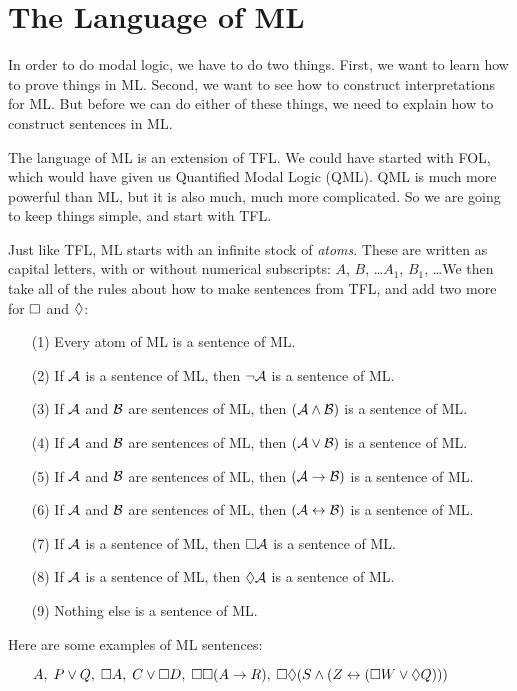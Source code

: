 \section{The Language of ML}
\label{TFLtoML}

In order to do modal logic, we have to do two things. First, we want to learn how to prove things in ML. Second, we want to see how to construct interpretations for ML. But before we can do either of these things, we need to explain how to construct sentences in ML.

The language of ML is an extension of TFL. We could have started with FOL, which would have given us Quantified Modal Logic (QML). QML is much more powerful than ML, but it is also much, much more complicated. So we are going to keep things simple, and start with TFL.

Just like TFL, ML starts with an infinite stock of \emph{atoms}. These are written as capital letters, with or without numerical subscripts: $A$, $B$, \dots  $A_1$, $B_1$, \dots  We then take all of the rules about how to make sentences from TFL, and add two more for $\Box$ and $\Diamond$:
\begin{itemize}
	\item[(1)]Every atom of ML is a sentence of ML.
	\item[(2)]If $\mathcal{A}$ is a sentence of ML, then $\neg\mathcal{A}$ is a sentence of ML.
	\item[(3)]If $\mathcal{A}$ and $\mathcal{B}$ are sentences of ML, then $(\mathcal{A}\wedge\mathcal{B})$ is a sentence of ML.
	\item[(4)]If $\mathcal{A}$ and $\mathcal{B}$ are sentences of ML, then $(\mathcal{A}\vee\mathcal{B})$ is a sentence of ML.
	\item[(5)]If $\mathcal{A}$ and $\mathcal{B}$ are sentences of ML, then $(\mathcal{A}\rightarrow\mathcal{B})$ is a sentence of ML.
	\item[(6)]If $\mathcal{A}$ and $\mathcal{B}$ are sentences of ML, then $(\mathcal{A}\leftrightarrow\mathcal{B})$ is a sentence of ML.
	\item[(7)]If $\mathcal{A}$ is a sentence of ML, then $\Box\mathcal{A}$ is a sentence of ML.
	\item[(8)]If $\mathcal{A}$ is a sentence of ML, then $\Diamond\mathcal{A}$ is a sentence of ML.
	\item[(9)]Nothing else is a sentence of ML.
\end{itemize}
Here are some examples of ML sentences:
\begin{itemize}
	\item[]$A,\;P\vee Q,\;\Box A,\;C\vee \Box D,\;\Box\Box (A\rightarrow R),\;\Box\Diamond (S\wedge (Z\leftrightarrow (\Box W \vee \Diamond Q)))$
\end{itemize}

